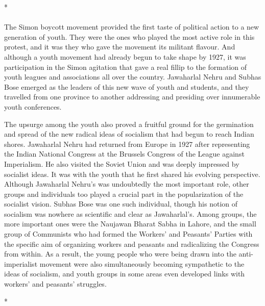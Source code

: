 \begin{multicols}{2}
\begin{center}*\end{center}

\paragraph*{}

The Simon boycott movement provided the first taste of political action to a new generation of youth. They were the ones who played the most active role in this protest, and it was they who gave the movement its militant flavour. And although a youth movement had already begun to take shape by 1927, it was participation in the Simon agitation that gave a real fillip to the formation of youth leagues and associations all over the country. Jawaharlal Nehru and Subhas Bose emerged as the leaders of this new wave of youth and students, and they travelled from one province to another addressing and presiding over innumerable youth conferences. 

The upsurge among the youth also proved a fruitful ground for the germination and spread of the new radical ideas of socialism that had begun to reach Indian shores. Jawaharlal Nehru had returned from Europe in 1927 after representing the Indian National Congress at the Brussels Congress of the League against Imperialism. He also visited the Soviet Union and was deeply impressed by socialist ideas. It was with the youth that he first shared his evolving perspective. Although Jawaharlal Nehru's was undoubtedly the most important role, other groups and individuals too played a crucial part in the popularization of the socialist vision. Subhas Bose was one such individual, though his notion of socialism was nowhere as scientific and clear as Jawaharlal's. Among groups, the more important ones were the Naujawan Bharat Sabha in Lahore, and the small group of Communists who had formed the Workers' and Peasants' Parties with the specific aim of organizing workers and peasants and radicalizing the Congress from within. As a result, the young people who were being drawn into the anti-imperialist movement were also simultaneously becoming sympathetic to the ideas of socialism, and youth groups in some areas even developed links with workers' and peasants' struggles.

\begin{center}*\end{center}

\paragraph*{}


\end{multicols}
